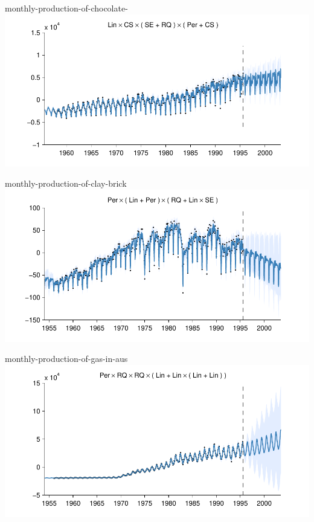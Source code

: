     
\begin{frame}{monthly-production-of-chocolate-}
  \center
  \includegraphics[width=1.0\textwidth]{figures/monthly-production-of-chocolate-/monthly-production-of-chocolate-_all}
\end{frame}  


    
\begin{frame}{monthly-production-of-clay-brick}
  \center
  \includegraphics[width=1.0\textwidth]{figures/monthly-production-of-clay-brick/monthly-production-of-clay-brick_all}
\end{frame}  


    
\begin{frame}{monthly-production-of-gas-in-aus}
  \center
  \includegraphics[width=1.0\textwidth]{figures/monthly-production-of-gas-in-aus/monthly-production-of-gas-in-aus_all}
\end{frame}  


